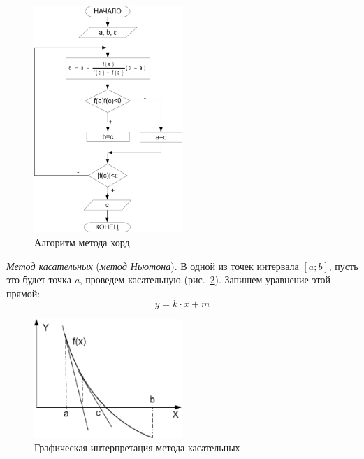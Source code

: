 \begin{figure}[htb]
\begin{center}
\includegraphics[width=0.5\textwidth]{img/ris_4_6}
\caption{Алгоритм метода хорд}
\label{ch04:refDrawing5}
\end{center}
\end{figure}

\emph{Метод касательных} (\emph{метод Ньютона}). В одной из точек интервала  $[a;b]$, пусть
это будет точка \emph{a}, проведем касательную (рис.~\ref{ch04:refDrawing6}). Запишем уравнение этой прямой:
\begin{equation}\label{ch04:refDrawing6a}
y=k\cdot x+m
\end{equation}

\begin{figure}[htb]
\begin{center}
\includegraphics[width=0.5\textwidth]{img/ris_4_7}
\caption{Графическая интерпретация метода касательных}
\label{ch04:refDrawing6}
\end{center}
\end{figure}

